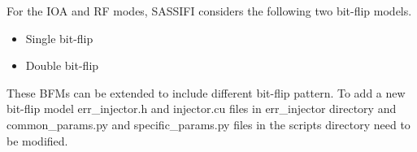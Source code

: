 For the IOA and RF modes, SASSIFI considers the following two bit-flip models.  
\begin{itemize}
\item Single bit-flip 
\item Double bit-flip 
\end{itemize}

These BFMs can be extended to include different bit-flip pattern. To add a new
bit-flip model err\_injector.h and injector.cu files in err\_injector directory
and common\_params.py and specific\_params.py files in the scripts directory
need to be modified. 

